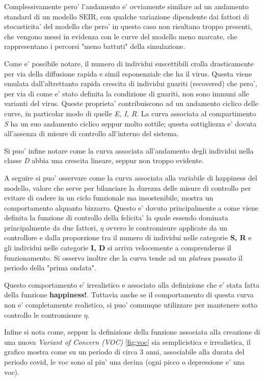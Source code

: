 Complessivamente pero' l'andamento e' ovviamente similare ad un andamento standard di un modello 
SEIR, con qualche variazione dipendente dai fattori di stocasticita' del modello che pero'
in questo caso non risultano troppo presenti, che vengono messi in evidenza con le curve del modello 
meno marcate, che rappresentano i percorsi "meno battuti" della simulazione.

Come e' possibile notare, il numero di individui suscettibili crolla drasticamente
per via della diffusione rapida e simil esponenziale che ha il virus. Questa viene emulata
dall'altrettanto rapida crescita di individui guariti (recovered) che pero', per via
di come e' stato definita la condizione di guariti, non sono immuni alle varianti del virus. 
Queste proprieta' contribuiscono ad un andamento ciclico delle curve, in particolar modo 
di quelle \emph{E, I, R}. La curva associata al compartimento \emph{S} ha un suo andamento
ciclico seppur molto sottile; questa sottigliezza e' dovuta all'assenza di misure di 
controllo all'interno del sistema.

Si puo' infine notare come la curva associata all'andamento degli individui
nella classe \emph{D} abbia una crescita lineare, seppur non troppo evidente.

A seguire si puo' osservare come la curva associata alla variabile di happiness del modello,
valore che serve per bilanciare la durezza delle misure di controllo per evitare 
di cadere in un ciclo funzionale ma insostenibile, mostra un comportamento alquanto bizzarro.
Questo e' dovuto principalmente a come viene definita la funzione di controllo della felicita' 
la quale essendo dominata principalmente da due fattori, $\eta$ ovvero le contromisure applicate
da un controllore e dalla proporzione tra il numero di individui nelle categorie \textbf{S, R} e 
gli individui nelle categorie \textbf{I, D} si arriva velocemente a comprenderne il funzionamento.
Si osserva inoltre che la curva tende ad un \emph{plateau} passato il periodo della "prima ondata". 

Questo comportamento e' irrealistico e associato alla definizione che e' stata fatta della 
funzione \textbf{happiness!}. Tuttavia anche se il comportamento di questa curva non e' 
completamente realistico, si puo' comunque utilizzare per mantenere sotto controllo le contromisure $\eta$.

Infine si nota come, seppur la definizione della funzione associata alla creazione di una
nuova \emph{Variant of Concern (VOC)} \ref{fig:voc} sia semplicistica e irrealistica, 
il grafico mostra come su un periodo di circa 3 anni, associabile alla durata del periodo covid, 
le voc sono al piu' una decina (ogni picco o depressione e' una voc). 

